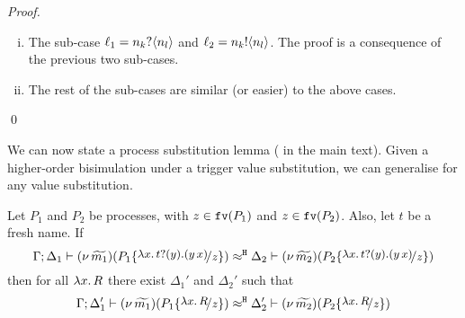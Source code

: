 \begin{proof}
\begin{enumerate}
\begin{enumerate}[i.]
					\item	The sub-case
							$\ell_1 = n_k ? \langle n_l \rangle$ and $\ell_2 = n_k ! \langle n_l \rangle$.
							The proof is a consequence of the previous two sub-cases.	




					\item	The rest of the sub-cases are similar (or easier) to the above cases.

%					
				\end{enumerate}
	\end{enumerate}
	\qed
\end{proof}




We can now state a process substitution lemma
( in the main text).
Given a higher-order bisimulation under a trigger value
substitution, we can generalise for any value substitution.


\begin{lemma}
	\label{lem:process_subst}
	Let $P_1$ and $P_2$ be processes, with $z \in \mathtt{fv}(P_1)$ and $z \in \mathtt{fv}(P_2)$.
	Also, let $t$ be a fresh name.
	If
	\[
		\horel{\Gamma}{\Delta_1}{\newsp{\widetilde{m_1}}{P_1 \subst{\trvalx{t}}{z} }}
		{\hwb}
		{\Delta_2}{\newsp{\widetilde{m_2}}{P_2 \subst{\trvalx{t}}{z} }}
	\]
	then for all $\lambda x.\,R$ there exist  $\Delta_1'$ and $\Delta_2'$ such that
	\[
		\horel{\Gamma}{\Delta_1'}{\newsp{\widetilde{m_1}}{P_1 \subst{{\abs{x}{R}}}{z} }}
		{\hwb}
		{\Delta_2'}{\newsp{\widetilde{m_2}}{P_2 \subst{{\abs{x}{R}}}{z} }}
	\]
\end{lemma}


